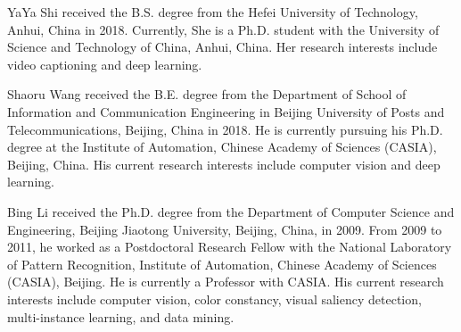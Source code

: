\documentclass[journal]{IEEEtran}
\begin{document}
\begin{IEEEbiography}
{YaYa Shi}
received the B.S. degree from the Hefei University of Technology, Anhui, China in 2018. Currently, She is a Ph.D. student with the University of Science and Technology of China, Anhui, China. Her research interests include video captioning and deep learning.
\end{IEEEbiography}

\begin{IEEEbiography}
{Shaoru Wang}
received the B.E. degree from the Department of School of Information and Communication Engineering in Beijing University of Posts and Telecommunications, Beijing, China in 2018. He is currently pursuing his Ph.D. degree at the Institute of Automation, Chinese Academy of Sciences (CASIA), Beijing, China. His current research interests include computer vision and deep learning.
\end{IEEEbiography}

\begin{IEEEbiography}
{Bing Li}
received the Ph.D. degree from the Department of Computer Science and Engineering, Beijing Jiaotong University, Beijing, China, in 2009. From 2009 to 2011, he worked as a Postdoctoral Research Fellow with the National Laboratory of Pattern Recognition, Institute of Automation, Chinese Academy of Sciences (CASIA), Beijing. He is currently a Professor with CASIA. His current research interests include computer vision, color constancy, visual saliency detection, multi-instance learning, and data mining.
\end{IEEEbiography}
\end{document}
